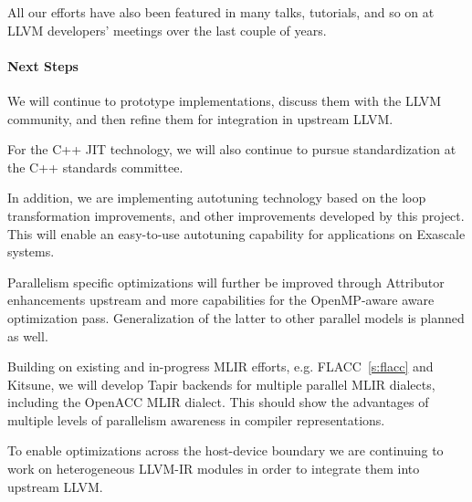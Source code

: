 All our efforts have also been featured in many talks, tutorials, and so on at
LLVM developers' meetings over the last couple of years.

\paragraph{Next Steps}
We will continue to prototype implementations, discuss them with the LLVM
community, and then refine them for integration in upstream LLVM.

For the C++ JIT technology, we will also continue to pursue standardization at
the C++ standards committee.

In addition, we are implementing autotuning technology based on the loop
transformation improvements, and other improvements developed by this project.
This will enable an easy-to-use autotuning capability for applications on
Exascale systems.

Parallelism specific optimizations will further be improved through Attributor
enhancements upstream and more capabilities for the OpenMP-aware aware
optimization pass. Generalization of the latter to other parallel models is
planned as well.

Building on existing and in-progress MLIR efforts, e.g.
FLACC~\ref{s:flacc} and Kitsune, we will develop Tapir backends for
multiple parallel MLIR dialects, including the OpenACC MLIR dialect.
This should show the advantages of multiple levels of parallelism
awareness in compiler representations.

To enable optimizations across the host-device boundary we are continuing to
work on heterogeneous LLVM-IR modules in order to integrate them into upstream
LLVM.


%
